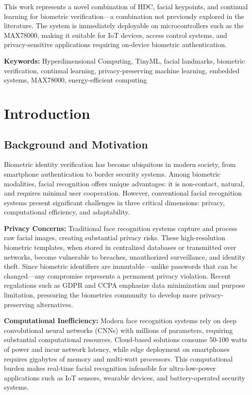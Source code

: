 \documentclass[a4paper,12pt]{article}
\begin{document}
This work represents a novel combination of HDC, facial keypoints, and continual learning for biometric verification—a combination not previously explored in the literature. The system is immediately deployable on microcontrollers such as the MAX78000, making it suitable for IoT devices, access control systems, and privacy-sensitive applications requiring on-device biometric authentication.

\textbf{Keywords:} Hyperdimensional Computing, TinyML, facial landmarks, biometric verification, continual learning, privacy-preserving machine learning, embedded systems, MAX78000, energy-efficient computing

\newpage

\setlength{\parskip}{0.5ex plus 0.5ex minus 0.2ex}
\tableofcontents
\setlength{\parskip}{2ex plus 0.5ex minus 0.2ex}

\newpage
\pagestyle{plain}

\section{Introduction}

\subsection{Background and Motivation}

Biometric identity verification has become ubiquitous in modern society, from smartphone authentication to border security systems. Among biometric modalities, facial recognition offers unique advantages: it is non-contact, natural, and requires minimal user cooperation. However, conventional facial recognition systems present significant challenges in three critical dimensions: privacy, computational efficiency, and adaptability.

\textbf{Privacy Concerns:} Traditional face recognition systems capture and process raw facial images, creating substantial privacy risks. These high-resolution biometric templates, when stored in centralized databases or transmitted over networks, become vulnerable to breaches, unauthorized surveillance, and identity theft. Since biometric identifiers are immutable—unlike passwords that can be changed—any compromise represents a permanent privacy violation. Recent regulations such as GDPR and CCPA emphasize data minimization and purpose limitation, pressuring the biometrics community to develop more privacy-preserving alternatives.

\textbf{Computational Inefficiency:} Modern face recognition systems rely on deep convolutional neural networks (CNNs) with millions of parameters, requiring substantial computational resources. Cloud-based solutions consume 50-100 watts of power and incur network latency, while edge deployment on smartphones requires gigabytes of memory and multi-watt processors. This computational burden makes real-time facial recognition infeasible for ultra-low-power applications such as IoT sensors, wearable devices, and battery-operated security systems.
\end{document}
